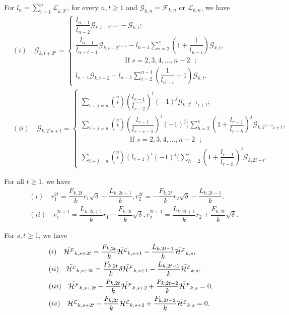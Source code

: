 \begin{theorem} For $l_n=\sum\limits_{i=1}^n\mathcal{L}_{k,2^i}$, for every $n, t\geq 1$ and $\mathcal{G}_{k,n}=\mathcal{F}_{k,n}$ or $\mathcal{L}_{k,n}$, we have\label{3.7t}
\begin{align*}
&(i)\quad \mathcal{G}_{k,{t+2^n}}= \begin{cases}
 \dfrac{l_{n-1}}{l_{n-2}} \mathcal{G}_{k,t+2^{n-1}}- \mathcal{G}_{k,t};\\
\dfrac{l_{n-1}}{l_{n-t-1}} \mathcal{G}_{k,{t+2^{n-s}}}-l_{n-1}\sum\limits_{i=2}^{s}(1+\dfrac{1}{l_{n-i}}) \mathcal{G}_{k,t},&\\\quad\quad\quad\quad\quad\quad\quad   \text{If $s=2, 3, 4,\hdots, n-2 $ };\\l_{n-1} \mathcal{G}_{k,{t+2}}-l_{n-1}\sum\limits_{i=2}^{n-1}(\dfrac{1}{l_{n-i}}+1) \mathcal{G}_{k,t}.
 \end{cases}\\
&(ii)\quad  \mathcal{G}_{k,{2^rn+t}}= \begin{cases}
\sum\limits_{i+j=n}\left( \stackrel{n}{i}\right)(\dfrac{l_{r-1}}{l_{r-2}})^i(-1)^j \mathcal{G}_{k,2^{r-1}i+t};\\
\sum\limits_{i+j=n}\left( \stackrel{n}{i}\right)(\dfrac{l_{r-1}}{l_{r-s-1}})^i(-1)^j (\sum_{h=2}^s(1+\dfrac{l_{r-1}}{l_{r-h}})^j\mathcal{G}_{k,2^{n-s}i+t}, &\\\quad\quad\quad\quad\quad\quad\quad \text{If $s=2, 3, 4,\hdots, n-2 $ };\\\sum\limits_{i+j=n}\left( \stackrel{n}{i}\right)({l_{r-1}})^i(-1)^j (\sum_{h=2}^s(1+\dfrac{l_{r-1}}{l_{r-h}})^j\mathcal{G}_{k,2i+t}.
 \end{cases}
 \end{align*}
\end{theorem}
\begin{lemma}
For all $t\geq 1$, we have\label{3.8l}
\begin{align*}
&(i)\quad r_1^{2t}=\dfrac{{F}_{k,2t}}{k}r_1\sqrt{\delta}-\dfrac{{L}_{k,2t-1}}{k},r_2^{2t}=-\dfrac{{F}_{k,2t}}{k}r_2\sqrt{\delta}-\dfrac{{L}_{k,2t-1}}{k}.\\
&(ii)\quad r_1^{2t+1}=\dfrac{{L}_{k,2t+1}}{k}r_1-\dfrac{{F}_{k,2t}}{k}\sqrt{\delta},r_2^{2t+1}=\dfrac{{L}_{k,2t+1}}{k}r_2+\dfrac{{F}_{k,2t}}{k}\sqrt{\delta}.
\end{align*}
\end{lemma}
\begin{theorem} For $s, t\geq 1$, we have\label{3.9t}
\begin{align*}
&(i)\quad\bar{{\mathcal{H^F}}}_{k,s+2t}=\dfrac{{F}_{k,2t}}{k}\bar{{\mathcal{H^L}}}_{k,s+1}-\dfrac{{L}_{k,2t-1}}{k}\bar{{\mathcal{H^F}}}_{k,s},\\
&(ii)\quad\bar{{\mathcal{H^L}}}_{k,s+2t}=\dfrac{{F}_{k,2t}}{k}\delta\bar{{\mathcal{H^F}}}_{k,s+1}-\dfrac{{L}_{k,2t-1}}{k}\bar{{\mathcal{H^L}}}_{k,s},\\
&(iii)\quad\bar{{\mathcal{H^F}}}_{k,s+2t}-\dfrac{{F}_{k,2t}}{k}\bar{{\mathcal{H^F}}}_{k,s+2}+\dfrac{{F}_{k,2t-2}}{k}\bar{{\mathcal{H^F}}}_{k,s}=0,\\
&(iv)\quad\bar{{\mathcal{H^L}}}_{k,s+2t}-\dfrac{{F}_{k,2t}}{k}\bar{{\mathcal{H^L}}}_{k,s+2}+\dfrac{{F}_{k,2t-2}}{k}\bar{{\mathcal{H^L}}}_{k,s}=0.
\end{align*}
\end{theorem}
